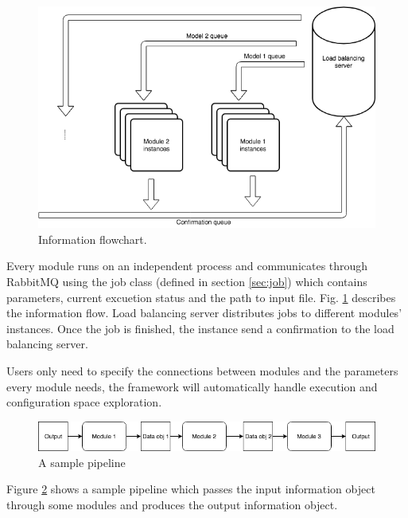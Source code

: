 \documentclass{article}
\begin{document}
    \begin{figure}[h]
        \begin{center}
            \includegraphics[width=\textwidth]{fig/information_flow.png}
        \end{center}
        \label{fig:information_flow}
        \caption{Information flowchart.}
    \end{figure}


    Every module runs on an independent process
    and communicates through RabbitMQ using the job class (defined in section \ref{sec:job}) which contains parameters, current excuetion status and the path to input file.
    Fig. \ref{fig:information_flow} describes the information flow.
    Load balancing server distributes jobs to different modules' instances.
    Once the job is finished, the instance send a confirmation to the load balancing server.


    Users only need to specify the connections between modules and the parameters every module needs,
    the framework will automatically handle execution and configuration space exploration.

    \begin{figure}[H]
        \begin{center}
            \includegraphics[width=1.2\textwidth]{fig/sample_pipeline.png}
        \end{center}
        \label{fig:sample_pipeline}
        \caption{A sample pipeline}
    \end{figure}
    Figure \ref{fig:sample_pipeline} shows a sample pipeline which passes the input information object
    through some modules and produces the output information object.
\end{document}
